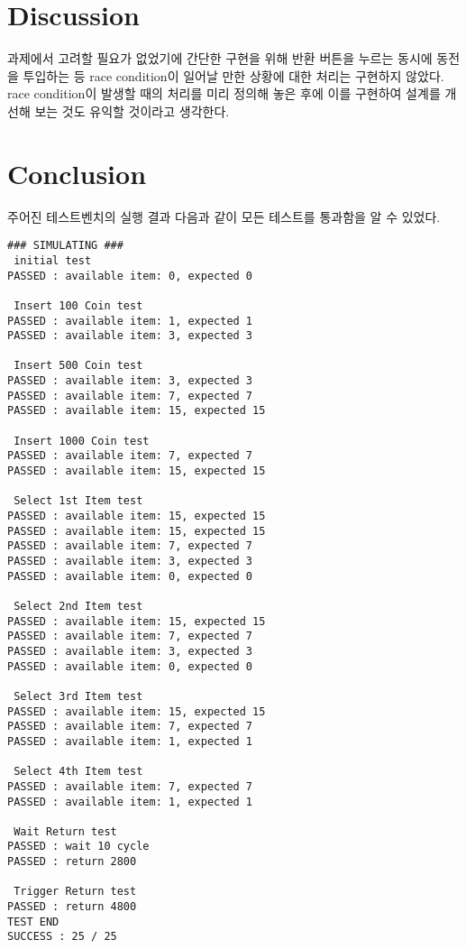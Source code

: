 \documentclass{scrartcl}
\begin{document}
\section{Discussion}
과제에서 고려할 필요가 없었기에 간단한 구현을 위해 반환 버튼을 누르는 동시에 동전을 투입하는 등 race condition이 일어날 만한
상황에 대한 처리는 구현하지 않았다. race condition이 발생할 때의 처리를 미리 정의해 놓은 후에 이를 구현하여 설계를 개선해 보는
것도 유익할 것이라고 생각한다.

\section{Conclusion}
주어진 테스트벤치의 실행 결과 다음과 같이 모든 테스트를 통과함을 알 수 있었다.

\begin{lstlisting}
### SIMULATING ###
 initial test
PASSED : available item: 0, expected 0

 Insert 100 Coin test
PASSED : available item: 1, expected 1
PASSED : available item: 3, expected 3

 Insert 500 Coin test
PASSED : available item: 3, expected 3
PASSED : available item: 7, expected 7
PASSED : available item: 15, expected 15

 Insert 1000 Coin test
PASSED : available item: 7, expected 7
PASSED : available item: 15, expected 15

 Select 1st Item test
PASSED : available item: 15, expected 15
PASSED : available item: 15, expected 15
PASSED : available item: 7, expected 7
PASSED : available item: 3, expected 3
PASSED : available item: 0, expected 0

 Select 2nd Item test
PASSED : available item: 15, expected 15
PASSED : available item: 7, expected 7
PASSED : available item: 3, expected 3
PASSED : available item: 0, expected 0

 Select 3rd Item test
PASSED : available item: 15, expected 15
PASSED : available item: 7, expected 7
PASSED : available item: 1, expected 1

 Select 4th Item test
PASSED : available item: 7, expected 7
PASSED : available item: 1, expected 1

 Wait Return test
PASSED : wait 10 cycle
PASSED : return 2800

 Trigger Return test
PASSED : return 4800
TEST END
SUCCESS : 25 / 25
\end{lstlisting}
\end{document}
